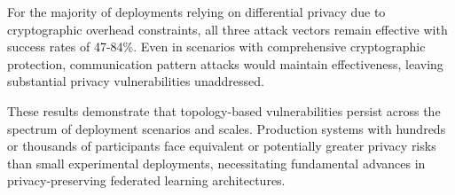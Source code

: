 For the majority of deployments relying on differential privacy due to cryptographic overhead constraints, all three attack vectors remain effective with success rates of 47-84\%. Even in scenarios with comprehensive cryptographic protection, communication pattern attacks would maintain effectiveness, leaving substantial privacy vulnerabilities unaddressed.

These results demonstrate that topology-based vulnerabilities persist across the spectrum of deployment scenarios and scales. Production systems with hundreds or thousands of participants face equivalent or potentially greater privacy risks than small experimental deployments, necessitating fundamental advances in privacy-preserving federated learning architectures.